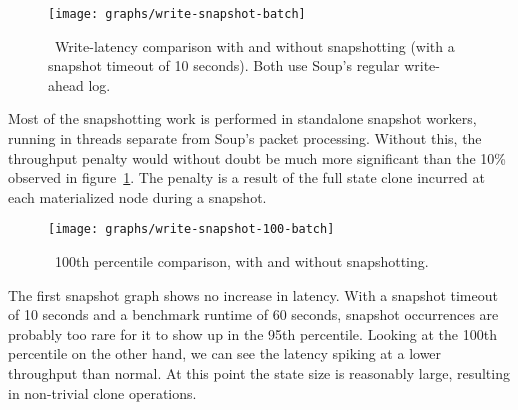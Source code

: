 \begin{figure}[H]
  \centering
  \texttt{[image: graphs/write-snapshot-batch]}
  \caption{\
    Write-latency comparison with and without snapshotting (with a snapshot
    timeout of 10 seconds). Both use Soup's regular write-ahead log.
  }\label{fig:graph-snapshot}
\end{figure}

Most of the snapshotting work is performed in standalone snapshot workers,
running in threads separate from Soup's packet processing. Without this, the
throughput penalty would without doubt be much more significant than the 10\%
observed in figure~\ref{fig:graph-snapshot}. The penalty is a result of the full
state clone incurred at each materialized node during a snapshot.

\begin{figure}[H]
  \centering
  \texttt{[image: graphs/write-snapshot-100-batch]}
  \caption{\
    100th percentile comparison, with and without snapshotting.
  }\label{fig:graph-snapshot-100}
\end{figure}

The first snapshot graph shows no increase in latency. With a snapshot timeout
of 10 seconds and a benchmark runtime of 60 seconds, snapshot occurrences are
probably too rare for it to show up in the 95th percentile. Looking at the 100th
percentile on the other hand, we can see the latency spiking at a lower
throughput than normal. At this point the state size is reasonably large,
resulting in non-trivial clone operations.
